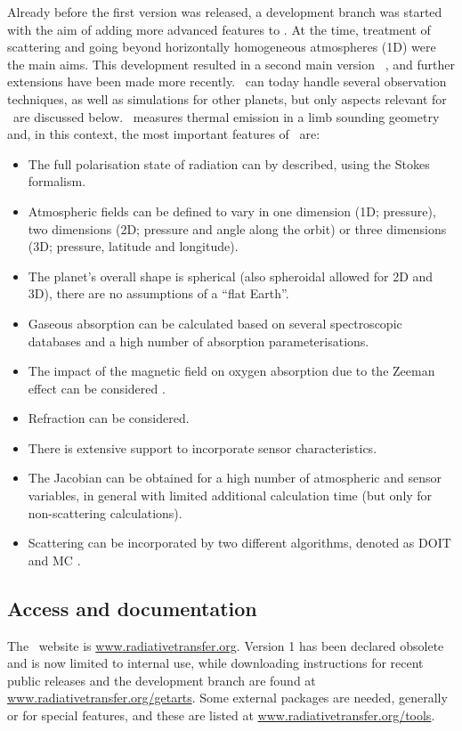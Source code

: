 Already before the first version was released, a development branch was started
with the aim of adding more advanced features to \ARTS. At the time, treatment
of scattering and going beyond horizontally homogeneous atmospheres (1D) were
the main aims. This development resulted in a second main version \ARTS\
\citep{eriksson:arts2:11}, and further extensions have been made more recently.
\ARTS\ can today handle several observation techniques, as well as simulations
for other planets, but only aspects relevant for \smr\ are discussed below.
\smr\ measures thermal emission in a limb sounding geometry and, in this
context, the most important features of \ARTS\ are:
\begin{itemize}
\item The full polarisation state of radiation can by described, using the Stokes
  formalism.
\item Atmospheric fields can be defined to vary in one dimension (1D;
  pressure), two dimensions (2D; pressure and angle along the orbit) or three
  dimensions (3D; pressure, latitude and longitude).
\item The planet's overall shape is spherical (also spheroidal allowed for 2D
  and 3D), there are no assumptions of a ``flat Earth''.
\item Gaseous absorption can be calculated based on several spectroscopic
  databases and a high number of absorption parameterisations.
\item The impact of the magnetic field on oxygen absorption due to the Zeeman
  effect can be considered \citep{larsson:zeema:14}.
\item Refraction can be considered.
\item There is extensive support to incorporate sensor characteristics.
\item The Jacobian can be obtained for a high number of atmospheric and sensor
  variables, in general with limited additional calculation time (but only
  for non-scattering calculations).
\item Scattering can be incorporated by two different algorithms, denoted as DOIT
  \citep{emde:apoli:04} and MC \citep{davisetal:04}.
\end{itemize}



\subsection{Access and documentation}
%
The \ARTS\ website is \url{www.radiativetransfer.org}. Version 1
has been declared obsolete and is now limited to internal use, while downloading
instructions for recent public releases and the development branch are found
at \url{www.radiativetransfer.org/getarts}. Some external packages are needed,
generally or for special features, and these are listed at
\url{www.radiativetransfer.org/tools}.

